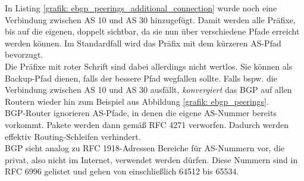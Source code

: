 In Listing \ref{grafik: ebgp_peerings_additional_connection} wurde noch eine Verbindung zwischen AS 10 und AS 30 hinzugefügt. Damit werden alle Präfixe, bis auf die eigenen, doppelt sichtbar, da sie nun über verschiedene Pfade erreicht werden können. Im Standardfall wird das Präfix mit dem kürzeren AS-Pfad bevorzugt.\\
Die Präfixe mit roter Schrift sind dabei allerdings nicht wertlos. Sie können als Backup-Pfad dienen, falls der bessere Pfad wegfallen sollte. Falls bspw. die Verbindung zwischen AS 10 und AS 30 ausfällt, \textit{konvergiert} das BGP auf allen Routern wieder hin zum Beispiel aus Abbildung \ref{grafik: ebgp_peerings}.\\
BGP-Router ignorieren AS-Pfade, in denen die eigene AS-Nummer bereits vorkommt. Pakete werden dann gemäß RFC 4271 verworfen. Dadurch werden effektiv Routing-Schleifen verhindert\cite{rfc4271}.\\
BGP sieht analog zu RFC 1918-Adressen Bereiche für AS-Nummern vor, die privat, also nicht im Internet, verwendet werden dürfen. Diese Nummern sind in RFC 6996 gelistet und gehen von einschließlich 64512 bis 65534\cite{rfc6996}.





